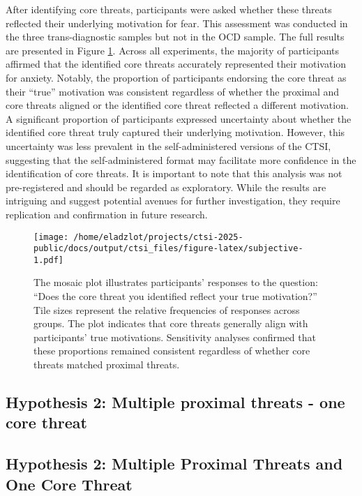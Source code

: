 \documentclass[
  man,floatsintext]{apa7}
\begin{document}
After identifying core threats, participants were asked whether these threats reflected their underlying motivation for fear.
This assessment was conducted in the three trans-diagnostic samples but not in the OCD sample.
The full results are presented in Figure \ref{fig:subjective}.
Across all experiments, the majority of participants affirmed that the identified core threats accurately represented their motivation for anxiety.
Notably, the proportion of participants endorsing the core threat as their ``true'' motivation was consistent regardless of whether the proximal and core threats aligned or the identified core threat reflected a different motivation.
A significant proportion of participants expressed uncertainty about whether the identified core threat truly captured their underlying motivation.
However, this uncertainty was less prevalent in the self-administered versions of the CTSI, suggesting that the self-administered format may facilitate more confidence in the identification of core threats.
It is important to note that this analysis was not pre-registered and should be regarded as exploratory.
While the results are intriguing and suggest potential avenues for further investigation, they require replication and confirmation in future research.



\begin{figure}
\centering
\texttt{[image: /home/eladzlot/projects/ctsi-2025-public/docs/output/ctsi\_files/figure-latex/subjective-1.pdf]}
\caption{\label{fig:subjective}The mosaic plot illustrates participants' responses to the question: ``Does the core threat you identified reflect your true motivation?'' Tile sizes represent the relative frequencies of responses across groups. The plot indicates that core threats generally align with participants' true motivations. Sensitivity analyses confirmed that these proportions remained consistent regardless of whether core threats matched proximal threats.}
\end{figure}

\subsection{Hypothesis 2: Multiple proximal threats - one core threat}\label{hypothesis-2-multiple-proximal-threats---one-core-threat}

\subsection{Hypothesis 2: Multiple Proximal Threats and One Core Threat}\label{hypothesis-2-multiple-proximal-threats-and-one-core-threat}
\end{document}
